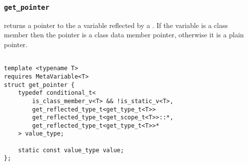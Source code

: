 
\subsubsection{\texttt{get\_pointer}}

returns a pointer to the a variable reflected by a .   If the variable is a class member then the pointer is a class data member pointer,   otherwise it is a plain pointer.

\begin{verbatim}

template <typename T>
requires MetaVariable<T>
struct get_pointer {
	typedef conditional_t<
		is_class_member_v<T> && !is_static_v<T>,
		get_reflected_type_t<get_type_t<T>>
		get_reflected_type_t<get_scope_t<T>>::*,
		get_reflected_type_t<get_type_t<T>>*
	> value_type;

	static const value_type value;
};



\end{verbatim}
